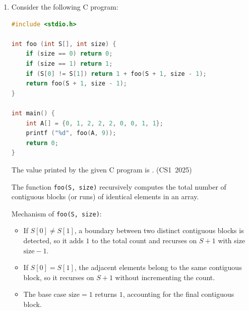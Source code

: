 \begin{enumerate}[label=\thesubsection.\arabic*, ref=\thesubsection.\theenumi]
Therefore, the circuit goes through 8 distinct states before returning to the initial state.

The following code verifies the solution:
\begin{lstlisting}[frame=single, basicstyle=\rmfamily, escapeinside={(*@}{@*)}]
(*@\makebox[\dimexpr\linewidth-2\fboxsep-2\fboxrule\relax][c]{codes/q23.c}@*)
\end{lstlisting}

\vspace{0.5cm}
\item Consider the following C program:
\begin{lstlisting}[language=C]
#include <stdio.h>

int foo (int S[], int size) {
    if (size == 0) return 0;
    if (size == 1) return 1;
    if (S[0] != S[1]) return 1 + foo(S + 1, size - 1);
    return foo(S + 1, size - 1);
}

int main() {
    int A[] = {0, 1, 2, 2, 2, 0, 0, 1, 1};
    printf ("%d", foo(A, 9));
    return 0;
}
\end{lstlisting}
The value printed by the given C program is \underline{\hspace{1cm}}.
\hfill (CS1~2025)

\vspace{0.2cm}
\solution
The function \texttt{foo(S, size)} recursively computes the total number of contiguous blocks (or runs) of identical elements in an array.

Mechanism of \texttt{foo(S, size)}:
\begin{itemize}
    \item If $S[0] \neq S[1]$, a boundary between two distinct contiguous blocks is detected, so it adds $1$ to the total count and recurses on $S+1$ with size $\text{size} - 1$.
    \item If $S[0] = S[1]$, the adjacent elements belong to the same contiguous block, so it recurses on $S+1$ without incrementing the count.
    \item The base case $\text{size} = 1$ returns $1$, accounting for the final contiguous block.
\end{itemize}


\end{enumerate}
